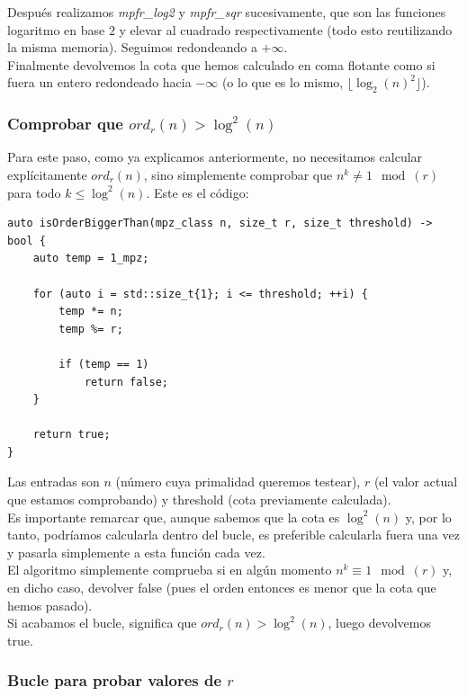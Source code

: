 Después realizamos \textit{mpfr\_log2} y \textit{mpfr\_sqr} sucesivamente, que son las funciones logaritmo en base $2$ y elevar al cuadrado respectivamente (todo esto reutilizando la misma memoria). Seguimos redondeando a $+\infty$.\\

Finalmente devolvemos la cota que hemos calculado en coma flotante como si fuera un entero redondeado hacia $-\infty$ (o lo que es lo mismo, $\lfloor \log_2(n)^2 \rfloor$).

\subsubsection{Comprobar que $ord_r(n) > \log^2(n)$}

Para este paso, como ya explicamos anteriormente, no necesitamos calcular explícitamente $ord_r(n)$, sino simplemente comprobar que $n^k \neq 1 \mod(r)$ para todo $k \leq \log^2(n)$. Este es el código:\\

\begin{lstlisting}
auto isOrderBiggerThan(mpz_class n, size_t r, size_t threshold) -> bool {
	auto temp = 1_mpz;
	
	for (auto i = std::size_t{1}; i <= threshold; ++i) {
		temp *= n;
		temp %= r;
		
		if (temp == 1)
			return false;
	}
	
	return true;
}
\end{lstlisting}

Las entradas son $n$ (número cuya primalidad queremos testear), $r$ (el valor actual que estamos comprobando) y threshold (cota previamente calculada).\\

Es importante remarcar que, aunque sabemos que la cota es $\log^2(n)$ y, por lo tanto, podríamos calcularla dentro del bucle, es preferible calcularla fuera una vez y pasarla simplemente a esta función cada vez.\\

El algoritmo simplemente comprueba si en algún momento $n^k \equiv 1 \mod(r)$ y, en dicho caso, devolver false (pues el orden entonces es menor que la cota que hemos pasado).\\

Si acabamos el bucle, significa que $ord_r(n) > \log^2(n)$, luego devolvemos true.

\subsubsection{Bucle para probar valores de $r$}

